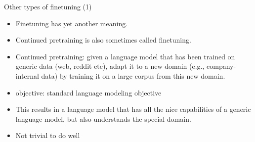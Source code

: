 \documentclass[11pt,compress,t,notes=noshow, xcolor=table]{beamer}
\begin{document}



\begin{frame}{Other types of finetuning (1)}

\vfill

\begin{itemize}
    \item Finetuning has yet another meaning.
    \item Continued pretraining is also sometimes called
    finetuning.
    \item Continued pretraining: given a language model
that has been    trained on generic data (web, reddit etc),
    adapt it to a new domain (e.g., company-internal data) by
    training it on a large corpus from this new domain.
\item objective: standard language modeling objective
    \item This results in a language model that has all the
    nice capabilities of a generic language model, but also understands the special domain.
\item Not trivial to do well
\end{itemize}

\vfill

\end{frame}
\end{document}
